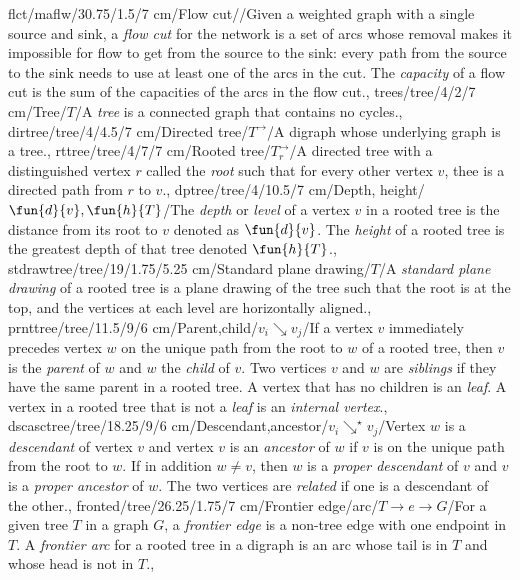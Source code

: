 flct/maflw/30.75/1.5/7 cm/{Flow cut}/{\watertap\Leftscissors}/{Given a weighted graph with a single source and sink, a \emph{flow cut} for the network is a set of arcs whose removal makes it impossible for flow to get from the source to the sink: every path from the source to the sink needs to use at least one of the arcs in the cut. The \emph{capacity} of a flow cut is the sum of the capacities of the arcs in the flow cut.},
trees/tree/4/2/7 cm/Tree/$T$/{A \emph{tree} is a connected graph that contains no cycles.},%
dirtree/tree/4/4.5/7 cm/{Directed tree}/{$T^{\rightarrow}$}/{A digraph whose underlying graph is a tree.},%
rttree/tree/4/7/7 cm/{Rooted tree}/{$T^{\rightarrow}_r$}/{A directed tree with a distinguished vertex $r$ called the \emph{root} such that for every other vertex $v$, thee is a directed path from $r$ to $v$.},%
dptree/tree/4/10.5/7 cm/{Depth, height}/{$\fun{d}{v},\fun{h}{T}$}/{The \emph{depth} or \emph{level} of a vertex $v$ in a rooted tree is the distance from its root to $v$ denoted as $\fun{d}{v}$. The \emph{height} of a rooted tree is the greatest depth of that tree denoted $\fun{h}{T}$.},%
stdrawtree/tree/19/1.75/5.25 cm/{Standard plane drawing}/{\smallpencil $T$}/{A \emph{standard plane drawing} of a rooted tree is a plane drawing of the tree such that the root is at the top, and the vertices at each level are horizontally aligned.},%
prnttree/tree/11.5/9/6 cm/{Parent,child}/{$v_i\searrow v_j$}/{If a vertex $v$ immediately precedes vertex $w$ on the unique path from the root to $w$ of a rooted tree, then $v$ is the \emph{parent} of $w$ and $w$ the \emph{child} of $v$. Two vertices $v$ and $w$ are \emph{siblings} if they have the same parent in a rooted tree. A vertex that has no children is an \emph{leaf}. A vertex in a rooted tree that is not a \emph{leaf} is an \emph{internal vertex}.},%
dscasctree/tree/18.25/9/6 cm/{Descendant,ancestor}/{$v_i\searrow^{\star} v_j$}/{Vertex $w$ is a \emph{descendant} of vertex $v$ and vertex $v$ is an \emph{ancestor} of $w$ if $v$ is on the unique path from the root to $w$. If in addition $w\neq v$, then $w$ is a \emph{proper descendant} of $v$ and $v$ is a \emph{proper ancestor} of $w$. The two vertices are \emph{related} if one is a descendant of the other.},%
fronted/tree/26.25/1.75/7 cm/{Frontier edge/arc}/{$T\rightarrow e\rightarrow G$}/{For a given tree $T$ in a graph $G$, a \emph{frontier edge} is a non-tree edge with one endpoint in $T$. A \emph{frontier arc} for a rooted tree in a digraph is an arc whose tail is in $T$ and whose head is not in $T$.},
